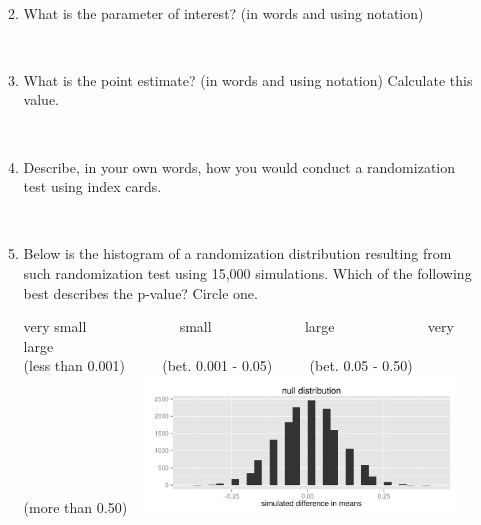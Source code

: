 \documentclass[11pt]{article}
\newcommand{\soln}[2]{$\:$\\ \vspace{#1}}{}
\begin{document}
\begin{enumerate}
\begin{enumerate}
\soln{2cm}{$H_0: p_{VVS+} = p_{VS-}$; Proportions of colorless VVS+ and VS- diamonds are equal. \\
$H_0: p_{VVS+} \ne p_{VS-}$; Proportions of colorless VVS+ and VS- diamonds are different.}

\item What is the parameter of interest? (in words and using notation)

\soln{1cm}{Difference between the population proportions of colorless VVS+ and VS- diamonds;  $p_{VVS+} = p_{VS-}$}

\item What is the point estimate? (in words and using notation) Calculate this value.

\soln{1cm}{Difference between the sample proportions of colorless VVS+ and VS- diamonds;  \\
$\hat{p}_{VVS+} = \hat{p}_{VS-} = 0.5 - 0.533 = -0.033$}

\item Describe, in your own words, how you would conduct a randomization test using index cards.

\soln{4cm}{Start with 150 index cards, 79 that say colorless and 71 near colorless on them. Shuffle these cards and 
split them into two groups, one of size 30 for VVS+ and another of size 120 for VS-. Calculate the proportions of 
colorless diamonds (cards) in each group and find the simulated difference $(\hat{p}_{VVS+} - \hat{p}_{VS-})$. Repeat 
this may times and calculate the proportion of simulations where the difference between the two proportions is at least 
0.033, in either direction since the alternative hypothesis is two sided.}

\vfill


\pagebreak

\item Below is the histogram of a randomization distribution resulting from such randomization test using 15,000 simulations. 
Which of the following best describes the p-value? Circle one.
\begin{center}
very small $\qquad \qquad \qquad$ small $\qquad \qquad \qquad$ large $\qquad \qquad \qquad$ very large  \\
(less than 0.001) $\qquad$ (bet. 0.001 - 0.05) $\qquad$ (bet. 0.05 - 0.50)$\qquad$ (more than 0.50)
$\:$ 
\includegraphics[width=0.7\textwidth]{figures/diamond/clar_col_ht_hist.pdf} 
\end{center}


\end{enumerate}
\end{enumerate}
\end{document}
